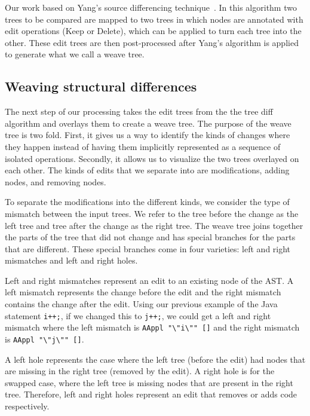 Our work based on Yang's source differencing technique~\cite{yang91diff}.
In this algorithm two trees to be compared are mapped to two trees in which
nodes are annotated with edit operations (Keep or Delete), which can be applied
to turn each tree into the other.  These edit trees are then post-processed
after Yang's algorithm is applied to generate what we call a weave tree.

\subsection{Weaving structural differences}

The next step of our processing takes the edit trees from the the tree diff
algorithm and overlays them to create a weave tree. The purpose of the weave
tree is two fold. First, it gives us a way to identify the kinds of changes
where they happen instead of having them implicitly represented as a sequence
of isolated operations. Secondly, it allows us to visualize the two trees
overlayed on each other. The kinds of edits that we separate into are
modifications, adding nodes, and removing nodes.

To separate the modifications into the different kinds, we consider the type of
mismatch between the input trees. We refer to the tree before the change as the
left tree and tree after the change as the right tree. The weave tree joins
together the parts of the tree that did not change and has special branches for
the parts that are different. These special branches come in four varieties:
left and right mismatches and left and right holes.

Left and right mismatches represent an edit to an existing node of the AST\@.
A left mismatch represents the change before the edit and the right mismatch
contains the change after the edit.  Using our previous example of the Java
statement {\tt i++;}, if we changed this to {\tt j++;}, we could get a left
and right mismatch where the left mismatch is {\tt AAppl
"\textbackslash"i\textbackslash"" []} and the right mismatch is {\tt AAppl
"\textbackslash"j\textbackslash"" []}. 

A left hole represents the case where the left tree (before the edit) had nodes
that are missing in the right tree (removed by the edit). A right hole is for
the swapped case, where the left tree is missing nodes that are present in the
right tree. Therefore, left and right holes represent an edit that removes or
adds code respectively.


